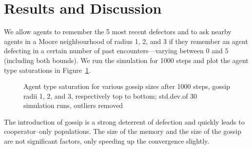 \documentclass[runningheads]{llncs}
\begin{document}
\section{Results and Discussion}
We allow agents to remember the 5 most recent defectors and to ask nearby agents in a Moore neighbourhood of radius 1, 2, and 3 if they remember an agent defecting in a certain number of past encounters---varying between $0$ and $5$ (including both bounds).
We run the simulation for 1000 steps and plot the agent type saturations in Figure~\ref{fig:agent_sat/gossip_size_step1000}.

\begin{figure}[tb]
  \centering
  \caption{Agent type saturation for various gossip sizes after 1000 steps, gossip radii 1, 2, and 3, respectively top to bottom; std.\@ dev.\@ of 30 simulation runs, outliers removed}
  \label{fig:agent_sat/gossip_size_step1000}
\end{figure}

The introduction of gossip is a strong deterrent of defection and quickly leads to cooperator--only populations.
The size of the memory and the size of the gossip are not significant factors, only speeding up the convergence slightly.
\end{document}
